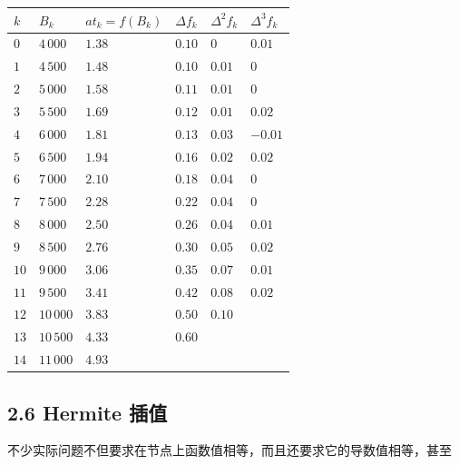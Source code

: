 {\def\LTcaptype{none} %
\begin{longtable}[]{@{}
  >{\raggedleft\arraybackslash}p{}
  >{\raggedleft\arraybackslash}p{}
  >{\raggedleft\arraybackslash}p{}
  >{\raggedleft\arraybackslash}p{}
  >{\raggedleft\arraybackslash}p{}
  >{\raggedleft\arraybackslash}p{}@{}}
\toprule\noalign{}
\begin{minipage}[b]{\linewidth}\raggedleft
\(k\)
\end{minipage} & \begin{minipage}[b]{\linewidth}\raggedleft
\(B_k\)
\end{minipage} & \begin{minipage}[b]{\linewidth}\raggedleft
\(at_k=f(B_k)\)
\end{minipage} & \begin{minipage}[b]{\linewidth}\raggedleft
\(\Delta f_k\)
\end{minipage} & \begin{minipage}[b]{\linewidth}\raggedleft
\(\Delta^2 f_k\)
\end{minipage} & \begin{minipage}[b]{\linewidth}\raggedleft
\(\Delta^3 f_k\)
\end{minipage} \\
\midrule\noalign{}
\endhead
\bottomrule\noalign{}
\endlastfoot
\(0\) & \(4\,000\) & \(1.38\) & \(0.10\) & \(0\) & \(0.01\) \\
\(1\) & \(4\,500\) & \(1.48\) & \(0.10\) & \(0.01\) & \(0\) \\
\(2\) & \(5\,000\) & \(1.58\) & \(0.11\) & \(0.01\) & \(0\) \\
\(3\) & \(5\,500\) & \(1.69\) & \(0.12\) & \(0.01\) & \(0.02\) \\
\(4\) & \(6\,000\) & \(1.81\) & \(0.13\) & \(0.03\) & \(-0.01\) \\
\(5\) & \(6\,500\) & \(1.94\) & \(0.16\) & \(0.02\) & \(0.02\) \\
\(6\) & \(7\,000\) & \(2.10\) & \(0.18\) & \(0.04\) & \(0\) \\
\(7\) & \(7\,500\) & \(2.28\) & \(0.22\) & \(0.04\) & \(0\) \\
\(8\) & \(8\,000\) & \(2.50\) & \(0.26\) & \(0.04\) & \(0.01\) \\
\(9\) & \(8\,500\) & \(2.76\) & \(0.30\) & \(0.05\) & \(0.02\) \\
\(10\) & \(9\,000\) & \(3.06\) & \(0.35\) & \(0.07\) & \(0.01\) \\
\(11\) & \(9\,500\) & \(3.41\) & \(0.42\) & \(0.08\) & \(0.02\) \\
\(12\) & \(10\,000\) & \(3.83\) & \(0.50\) & \(0.10\) & \\
\(13\) & \(10\,500\) & \(4.33\) & \(0.60\) & & \\
\(14\) & \(11\,000\) & \(4.93\) & & & \\
\end{longtable}
}

\subsection{2.6 Hermite 插值}\label{ch02a-hermite-ux63d2ux503c}

不少实际问题不但要求在节点上函数值相等，而且还要求它的导数值相等，甚至


